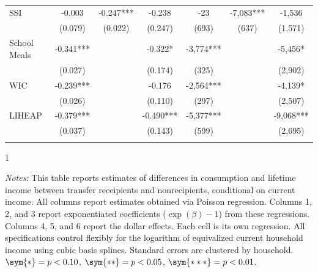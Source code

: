 \begin{table}[h!]
\begin{tabular*}{1.36\textwidth}{@{\extracolsep{\fill}}lcccccc}
SSI                & -0.003    & -0.247***     & -0.238      & -23     & -7,083***                           & -1,536                        \\
                   & (0.079)    & (0.022)      & (0.247)      & (693)        & (637)                   & (1,571)                        \\  \addlinespace
School Meals                 & -0.341***   &    & -0.322*       & -3,774***          &                 & -5,456*                         \\
                   & (0.027)  &     & (0.174)       & (325)        &                  & (2,902)                         \\  \addlinespace
WIC                & -0.239***   &   & -0.176      & -2,564***           &                    & -4,139*                        \\
                   & (0.026)    &  & (0.110)      & (297)               &                & (2,507)                        \\   \addlinespace
LIHEAP             & -0.379*** &  & -0.490***   & -5,377***             &               & -9,068***                     \\
                   & (0.037) &  & (0.143)   & (599)                 &           & (2,695)                 \\ \addlinespace \bottomrule   
                \end{tabular*}
                \begin{spacing}{1}
                    \begin{tablenotes}
                          \item \footnotesize \textit{Notes:} This table reports estimates of differences in consumption and lifetime income between transfer receipients and nonrecipients, conditional on current income. All columns report estimates obtained via Poisson regression. Columns 1, 2, and 3 report exponentiated coefficients ($\exp(\beta)-1$) from these regressions. Columns 4, 5, and 6 report the dollar effects. Each cell is its own regression. All specifications control flexibly for the logarithm of equivalized current household income using cubic basis splines. Standard errors are clustered by household. $\sym{*} = p < 0.10$, $\sym{**} = p < 0.05$, $\sym{***} = p < 0.01$.
                          \end{tablenotes}
                           \end{spacing}
                    \end{table}